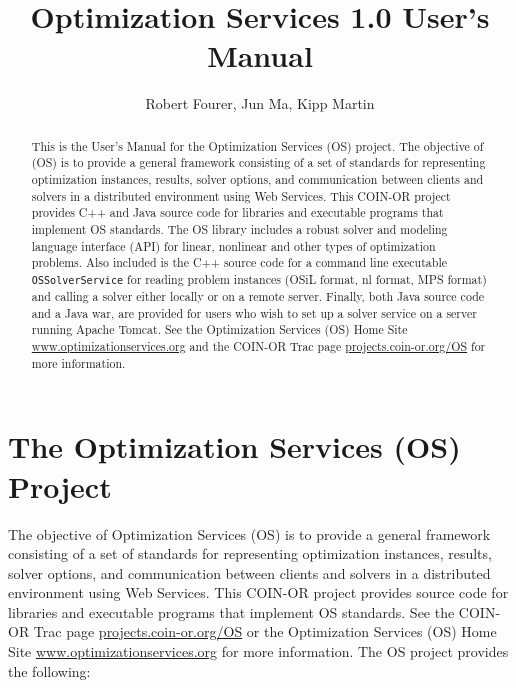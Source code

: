 \documentclass[11pt]{article}
\renewcommand{\_}{{\char"5F}}
\renewcommand{\{}{{\char"7B}}
\renewcommand{\}}{{\char"7D}}
\renewcommand{\^}{{\char"0D}}
\renewcommand{\'}{{\char"0D}}
\begin{document}
\title{Optimization Services 1.0 User's Manual }
\vskip 2in
\author{Robert Fourer, Jun Ma, Kipp Martin}
\maketitle

\begin{abstract}
This is the User's Manual for the Optimization Services (OS) project.  The objective of  (OS) is to provide a general framework consisting of a set of standards for representing optimization instances, results, solver options, and communication between clients and solvers in a distributed environment using Web Services. This COIN-OR project provides C++ and Java source code for libraries and executable programs that implement OS standards.   The OS library includes a robust solver and modeling language interface (API) for linear, nonlinear and other types of optimization problems.   Also included is the C++ source code for a  command line executable {\tt OSSolverService}  for reading problem instances (OSiL format, nl format, MPS format) and calling a solver either locally or on a remote server.  Finally,  both Java source code and a Java war, are provided for users who wish to set up a solver service on a server running Apache Tomcat.   See the Optimization Services (OS) Home Site \url{www.optimizationservices.org} and the COIN-OR Trac page \url{projects.coin-or.org/OS} for more information.
\end{abstract}


\newpage
\tableofcontents
\listoffigures
\listoftables
{}



\newpage

\section{The Optimization Services (OS) Project}

The objective of Optimization Services (OS) is to provide a general framework consisting of a set of standards for representing optimization instances, results, solver options, and communication between clients and solvers in a distributed environment using Web Services. This COIN-OR project provides source code for libraries and executable programs that implement OS standards.  See the COIN-OR Trac page \url{projects.coin-or.org/OS} or the Optimization Services (OS) Home Site \url{www.optimizationservices.org}   for more information. The OS project provides the following:
\end{document}
